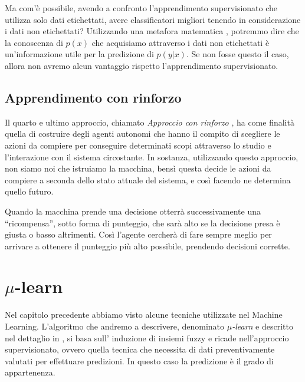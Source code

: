 \documentclass[a4paper,12pt]{report}
\begin{document}
Ma com'è possibile, avendo a confronto l'apprendimento supervisionato che utilizza solo dati etichettati, avere classificatori migliori tenendo in considerazione i dati non etichettati?
Utilizzando una metafora matematica \cite{supervisedlearning}, potremmo dire che la conoscenza di $p(x)$ che acquisiamo attraverso i dati non etichettati è un'informazione utile per la predizione di $p(y|x)$. Se non fosse questo il caso, allora non avremo alcun vantaggio rispetto l'apprendimento supervisionato.

\subsection*{Apprendimento con rinforzo}
Il quarto e ultimo approccio, chiamato \textit{Approccio con rinforzo} \cite{Reinforcement_learning}, ha come finalità quella di costruire degli agenti autonomi che hanno il compito di scegliere le azioni da compiere per conseguire determinati scopi attraverso lo studio e l'interazione con il sistema circostante.
In sostanza, utilizzando questo approccio, non siamo noi che istruiamo la macchina, bensì questa decide le azioni da compiere a seconda dello stato attuale del sistema, e così facendo ne determina quello futuro.

Quando la macchina prende una decisione otterrà successivamente una “ricompensa”, sotto forma di punteggio, che sarà alto se la decisione presa è giusta o basso altrimenti. Così l'agente cercherà di fare sempre meglio per arrivare a ottenere il punteggio più alto possibile, prendendo decisioni corrette.


\section{\texorpdfstring{$\mu$}{mu}-learn}
Nel capitolo precedente abbiamo visto alcune tecniche utilizzate nel Machine Learning. L’algoritmo che andremo a descrivere, denominato \textit{$\mu$-learn} e descritto nel dettaglio in \cite{mulearn}, si basa sull’ induzione di insiemi fuzzy e ricade nell’approccio supervisionato, ovvero quella tecnica che necessita di dati preventivamente valutati per effettuare predizioni. In questo caso la predizione è il grado di appartenenza.
\bigskip
\end{document}
